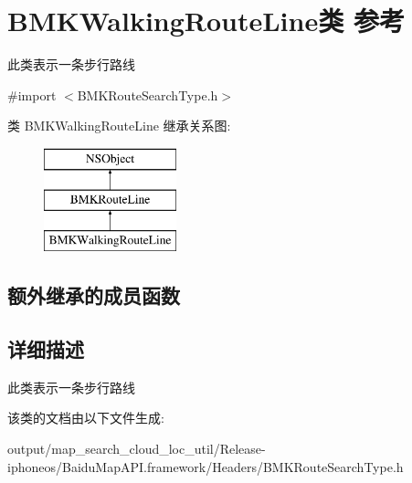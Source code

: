 \hypertarget{interface_b_m_k_walking_route_line}{}\section{B\+M\+K\+Walking\+Route\+Line类 参考}
\label{interface_b_m_k_walking_route_line}


此类表示一条步行路线  




{\ttfamily \#import $<$B\+M\+K\+Route\+Search\+Type.\+h$>$}

类 B\+M\+K\+Walking\+Route\+Line 继承关系图\+:\begin{figure}[H]
\begin{center}
\leavevmode
\includegraphics[height=3.000000cm]{interface_b_m_k_walking_route_line}
\end{center}
\end{figure}
\subsection*{额外继承的成员函数}


\subsection{详细描述}
此类表示一条步行路线 

该类的文档由以下文件生成\+:\begin{DoxyCompactItemize}
\item 
output/map\+\_\+search\+\_\+cloud\+\_\+loc\+\_\+util/\+Release-\/iphoneos/\+Baidu\+Map\+A\+P\+I.\+framework/\+Headers/B\+M\+K\+Route\+Search\+Type.\+h\end{DoxyCompactItemize}
